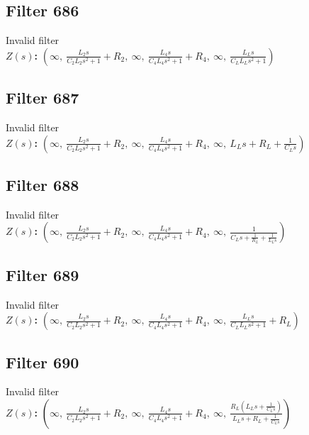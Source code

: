 \documentclass{article}
\begin{document}
\subsection*{Filter 686}
Invalid filter \\ 
\textbf{$Z(s)$:} $\left( \infty, \  \frac{L_{2} s}{C_{2} L_{2} s^{2} + 1} + R_{2}, \  \infty, \  \frac{L_{4} s}{C_{4} L_{4} s^{2} + 1} + R_{4}, \  \infty, \  \frac{L_{L} s}{C_{L} L_{L} s^{2} + 1}\right)$ \\ 
\subsection*{Filter 687}
Invalid filter \\ 
\textbf{$Z(s)$:} $\left( \infty, \  \frac{L_{2} s}{C_{2} L_{2} s^{2} + 1} + R_{2}, \  \infty, \  \frac{L_{4} s}{C_{4} L_{4} s^{2} + 1} + R_{4}, \  \infty, \  L_{L} s + R_{L} + \frac{1}{C_{L} s}\right)$ \\ 
\subsection*{Filter 688}
Invalid filter \\ 
\textbf{$Z(s)$:} $\left( \infty, \  \frac{L_{2} s}{C_{2} L_{2} s^{2} + 1} + R_{2}, \  \infty, \  \frac{L_{4} s}{C_{4} L_{4} s^{2} + 1} + R_{4}, \  \infty, \  \frac{1}{C_{L} s + \frac{1}{R_{L}} + \frac{1}{L_{L} s}}\right)$ \\ 
\subsection*{Filter 689}
Invalid filter \\ 
\textbf{$Z(s)$:} $\left( \infty, \  \frac{L_{2} s}{C_{2} L_{2} s^{2} + 1} + R_{2}, \  \infty, \  \frac{L_{4} s}{C_{4} L_{4} s^{2} + 1} + R_{4}, \  \infty, \  \frac{L_{L} s}{C_{L} L_{L} s^{2} + 1} + R_{L}\right)$ \\ 
\subsection*{Filter 690}
Invalid filter \\ 
\textbf{$Z(s)$:} $\left( \infty, \  \frac{L_{2} s}{C_{2} L_{2} s^{2} + 1} + R_{2}, \  \infty, \  \frac{L_{4} s}{C_{4} L_{4} s^{2} + 1} + R_{4}, \  \infty, \  \frac{R_{L} \left(L_{L} s + \frac{1}{C_{L} s}\right)}{L_{L} s + R_{L} + \frac{1}{C_{L} s}}\right)$ \\ 
\end{document}
